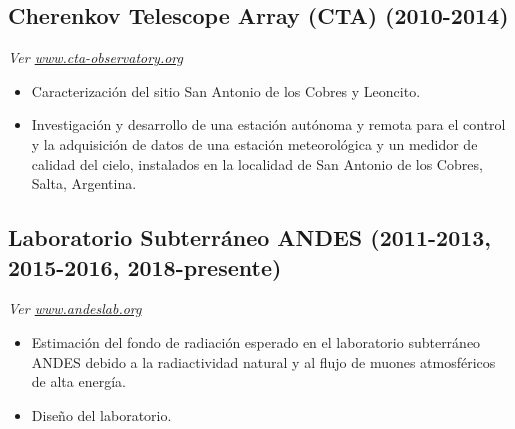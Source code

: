 \subsection*{Cherenkov Telescope Array (CTA) (2010-2014)}
{\small{\textit{Ver \href{http://www.cta-observatory.org}{www.cta-observatory.org}}}}
\begin{itemize}
\item Caracterización del sitio San Antonio de los Cobres y Leoncito. %
\item Investigación y desarrollo de una estación autónoma y remota para el control y la adquisición de datos de una estación meteorológica y un medidor de calidad del cielo, instalados en la localidad de San Antonio de los Cobres, Salta, Argentina.
\end{itemize}

\subsection*{Laboratorio Subterráneo ANDES (2011-2013, 2015-2016, 2018-presente)}
{\small{\textit{Ver \href{http://www.andeslab.org}{www.andeslab.org}}}}
\begin{itemize}
\item Estimación del fondo de radiación esperado en el laboratorio subterráneo ANDES debido a la radiactividad natural y al flujo de muones atmosféricos de alta energía.
\item Diseño del laboratorio.
\end{itemize}

